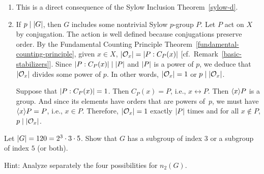 \begin{solution}
\begin{enumerate}[\upshape a)]
    \item This is a direct consequence of the Sylow Inclusion Theorem~\ref{sylow-d}.

    \item If $p\mid\left\vert{G}\right\vert$, then $G$ includes some nontrivial Sylow $p$-group $P$. Let $P$ act on $X$ by conjugation. The action is well defined because conjugations preserve order. By the Fundamental Counting Principle Theorem~\ref{fundamental-counting-principle}, given $x\in X$, $|{\cal O}_x|=\left\vert{P:C_P(x)}\right\vert$ [cf.~Remark~\ref{basic-stabilizers}]. Since $\left\vert{P:C_P(x)}\right\vert\mid\left\vert{P}\right\vert$ and $\left\vert{P}\right\vert$ is a power of $p$, we deduce that $\left\vert{{\cal O}_x}\right\vert$ divides some power of $p$. In other words, $\left\vert{{\cal O}_x}\right\vert=1$ or $p\mid \left\vert{{\cal O}_x}\right\vert$.
    
    Suppose that $\left\vert{P:C_P(x)}\right\vert=1$. Then $C_P(x)=P$, i.e., $x\leftrightarrow P$. Then $\langle x\rangle P$ is a group. And since its elements have orders that are powers of~$p$, we must have $\langle x\rangle P=P$, i.e., $x\in P$. Therefore, $\left\vert{{\cal O}_x}\right\vert=1$ exactly $\left\vert{P}\right\vert$ times and for all $x\notin P$, $p\mid\left\vert{{\cal O}_x}\right\vert$.
\end{enumerate}
\end{solution}

\begin{probl}
    Let $\left\vert{G}\right\vert = 120 = 2^3 \cdot 3 \cdot 5$. Show that $G$ has a subgroup of index $3$ or a subgroup of index\/ $5$ (or both).

    \textrm{\upshape Hint: Analyze separately the four possibilities for $n_2(G)$}.
\end{probl}

